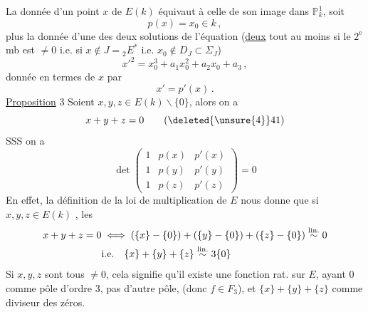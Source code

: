 La donnée d'un point $x$  de $E(k)$ équivaut à celle de son image dans $\mathbb P^1_k$, soit 
\[
 p(x)=x_0\in k\,, \tag*{(38)}
\]
plus la donnée d'une des deux solutions  de l'équation (\uline{deux} tout au moins si le $2^{\mathrm e}$ mb est $\ne0$ i.e. si $x\notin J={}_2E^*$ i.e. $x_0\notin D_J\subset\Sigma_J$)
\[
 {x'}^2=x_0^3+a_1x_0^2+a_2x_0+a_3\,, \tag*{(39)}
\]
donnée en termes de $x$ par
\[
 x'=p'(x)\,. \tag*{(40)}
\]
\uline{Proposition} 3 Soient $x,y,z\in E(k)\smallsetminus\{0\}$,  alors on a
\[
 x+y+z=0 \tag*{(\deleted{\unsure{4}}41)}
\]
SSS on a 
\[
 \det\begin{pmatrix}
 1&p(x)&p'(x)\\
 1&p(y)&p'(y)\\
 1&p(z)&p'(z)
 \end{pmatrix}=0 \tag*{(42)}
\]
En effet, la définition de la loi de multiplication de $E$ nous donne que si $x,y,z\in E(k)$ , les 
\[
 \begin{aligned}
 x+y+z=0&\iff(\{x\}-\{0\})+(\{y\}-\{0\})+(\{z\}-\{0\})\overset{\rm lin.}{\sim}0\\
 &\text{i.e.}\quad\{x\}+\{y\}+\{z\}\overset{\rm lin.}{\sim}3\{0\}
 \end{aligned}
\]
Si $x,y,z$ sont tous $\ne0$, cela signifie qu'il existe une fonction rat. sur $E$, ayant $0$ comme pôle d'ordre 3, pas d'autre pôle, (donc $f\in F_3$), et $\{x\}+\{y\}+\{z\}$ comme  diviseur des zéros.
